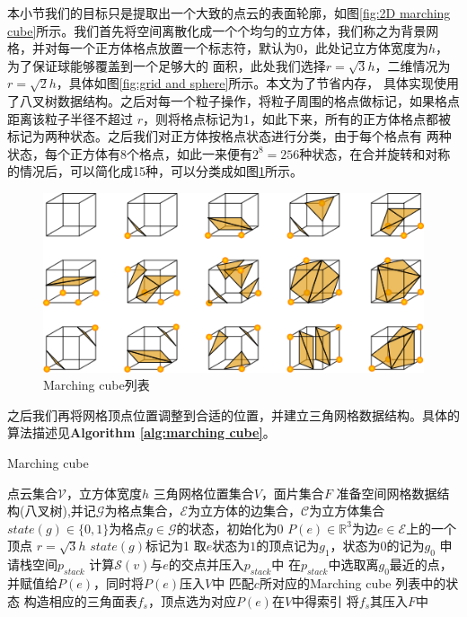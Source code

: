 本小节我们的目标只是提取出一个大致的点云的表面轮廓，如图\ref{fig:2D marching cube}所示。我们首先将空间离散化成一个个均匀的立方体，我们称之为背景网格，并对每一个正方体格点放置一个标志符，默认为0，此处记立方体宽度为$h$，为了保证球能够覆盖到一个足够大的
面积，此处我们选择$r = \sqrt{3}h$，二维情况为$r = \sqrt{2}h$，具体如图\ref{fig:grid and sphere}所示。本文为了节省内存，
具体实现使用了八叉树数据结构。之后对每一个粒子操作，将粒子周围的格点做标记，如果格点距离该粒子半径不超过
$r$，则将格点标记为1，如此下来，所有的正方体格点都被标记为两种状态。之后我们对正方体按格点状态进行分类，由于每个格点有
两种状态，每个正方体有8个格点，如此一来便有$2^8 = 256$种状态，在合并旋转和对称的情况后，可以简化成15种，可以分类成如图\ref{fig:marching cube table}所示。
\begin{figure}[htbp]
    \centering
    \includegraphics[scale=0.6]{./images/image6.png}
    \caption{Marching cube列表}
    \label{fig:marching cube table}
\end{figure}
之后我们再将网格顶点位置调整到合适的位置，并建立三角网格数据结构。具体的算法描述见\textbf{Algorithm \ref{alg:marching cube}}。
\begin{algorithm}
    \caption{Marching cube}
    \label{alg:marching cube}
    \begin{algorithmic}[1]
    \Require 点云集合$\mathcal{V}$，立方体宽度$h$
    \Ensure 三角网格位置集合$V$，面片集合$F$
    \State 准备空间网格数据结构(八叉树),并记$\mathcal{G}$为格点集合，$\mathcal{E}$为立方体的边集合，$\mathcal{C}$为立方体集合
    \State $state(g)\in \{0,1\}$为格点$g\in \mathcal{G}$的状态，初始化为0
    \State $P(e)\in \mathbb{R}^3$为边$e\in \mathcal{E}$上的一个顶点
    \State $r = \sqrt{3}h$
            \State $state(g)$标记为1    
        \EndFor
    \EndFor    
      \State  取$e$状态为$1$的顶点记为$g_1$，状态为$0$的记为$g_0$
      \State 申请栈空间$p_{stack}$
        \State 计算$\mathcal{S}(v)$与$e$的交点并压入$p_{stack}$中
      \EndFor
      \State 在$p_{stack}$中选取离$g_0$最近的点，并赋值给$P(e)$，同时将$P(e)$压入$V$中
    \EndFor
        \State 匹配$c$所对应的Marching cube 列表中的状态
        \State 构造相应的三角面表$f_s$，顶点选为对应$P(e)$在$V$中得索引
        \State 将$f_s$其压入$F$中
    \EndFor
    \end{algorithmic}
\end{algorithm}

